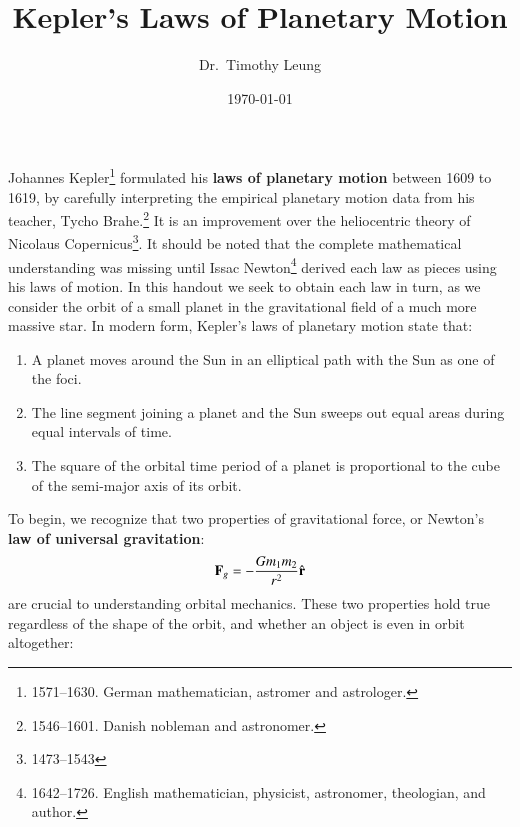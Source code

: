 \documentclass{../../../oss-handout}
\title{Kepler's Laws of Planetary Motion}
\author{Dr.\ Timothy Leung}
\date{\today}
\newcommand{\mb}[1]{\ensuremath\mathbf{#1}}
\begin{document}
\thispagestyle{title}
\gentitle

Johannes Kepler\footnote{1571--1630. German mathematician, astromer and
  astrologer.} formulated his \textbf{laws of planetary motion}
between 1609 to 1619, by carefully interpreting the empirical planetary motion
data from his teacher, Tycho Brahe.\footnote{1546--1601. Danish nobleman and
  astronomer.} It is an improvement over the heliocentric
theory of Nicolaus Copernicus\footnote{1473--1543}. It should be noted that the
complete mathematical understanding was missing until Issac
Newton\footnote{1642--1726. English mathematician, physicist, astronomer,
  theologian, and author.} derived each law as pieces using his laws of motion.
In this handout we seek to obtain each law in turn, as we consider the orbit of
a small planet in the gravitational field of a much more massive star. In
modern form, Kepler's laws of planetary motion state that:
\begin{enumerate}[leftmargin=18pt,noitemsep,topsep=0pt]
\item A planet moves around the Sun in an elliptical path with the Sun as one
  of the foci.
\item The line segment joining a planet and the Sun sweeps out equal areas
  during equal intervals of time.
\item The square of the orbital time period of a planet is proportional to the
  cube of the semi-major axis of its orbit.
\end{enumerate}
To begin, we recognize that two properties of gravitational force, or Newton's
\textbf{law of universal gravitation}:
\begin{equation}
  \mb{F}_g=-\frac{Gm_1m_2}{r^2}\hat{\mb{r}}
\end{equation}
are crucial to
understanding orbital mechanics. These two properties hold true regardless
of the shape of the orbit, and whether an object is even in orbit altogether:
\end{document}
